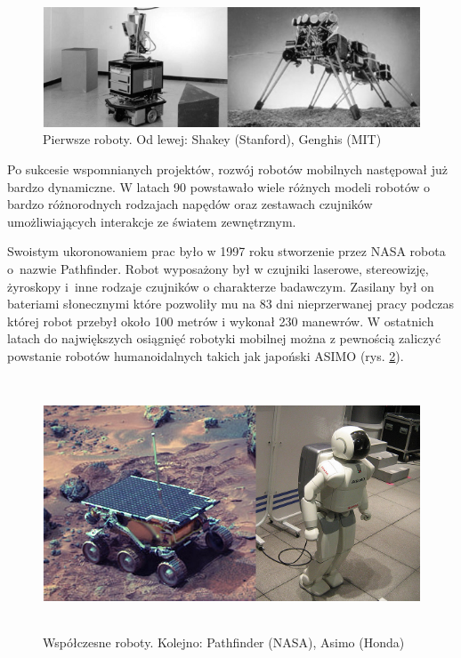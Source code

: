 \begin{figure}[h!]
 \centering
 \includegraphics[width=\textwidth]{../images/ch01/shakey_and_genghis.png}
 \caption{Pierwsze roboty. Od lewej: Shakey (Stanford), Genghis (MIT) }
 \label{fig:RobotsHistory_Shakey_Genghis}
\end{figure}

Po sukcesie wspomnianych projektów, rozwój robotów mobilnych następował już
bardzo dynamiczne. W latach 90 powstawało wiele różnych modeli robotów o bardzo
różnorodnych rodzajach napędów oraz zestawach czujników umożliwiających
interakcje ze światem zewnętrznym.

Swoistym ukoronowaniem prac było w 1997 roku stworzenie przez NASA robota
o~nazwie Pathfinder. Robot wyposażony był w czujniki laserowe, stereowizję,
żyroskopy i~inne rodzaje czujników o charakterze badawczym. Zasilany był on
bateriami słonecznymi które pozwoliły mu na 83 dni nieprzerwanej pracy podczas
której robot przebył około 100 metrów i wykonał 230 manewrów. W ostatnich latach
do największych osiągnięć robotyki mobilnej można z pewnością zaliczyć powstanie
robotów humanoidalnych takich jak japoński ASIMO (rys.
\ref{fig:RobotsHistory_Pathfinder_Asimo}).

\begin{figure}[h!]
 \centering
 \includegraphics[height=75mm]{../images/ch01/pathfinder_and_asimo.png}
 \caption{Współczesne roboty. Kolejno: Pathfinder (NASA), Asimo (Honda)}
 \label{fig:RobotsHistory_Pathfinder_Asimo}
\end{figure}

